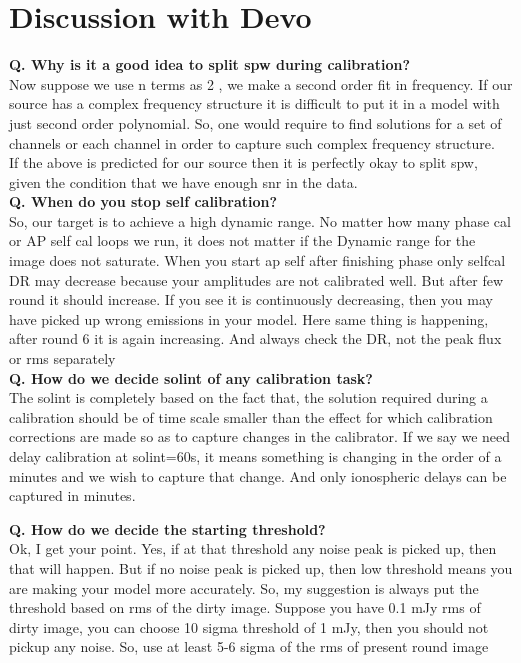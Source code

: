 \documentclass[11pt]{report}
\newcommand{\tbf}[1]{\textbf{#1}}
\begin{document}
\section{Discussion with Devo}
\tbf{Q.  Why is it a good idea to split spw during calibration?}\\

Now suppose we use n terms as 2 , we make a second order fit in frequency. If our source has a complex frequency structure it is difficult to put it in a model with just second order polynomial. So, one would require to find solutions for a set of channels or each channel in order to capture such complex frequency structure. \\

If the above is predicted for our source then it is perfectly okay to split spw,  given the condition that we have enough snr in the data. \\


\tbf{Q. When do you stop self calibration?}\\

So, our target is to achieve a high dynamic range. No matter how many phase cal or AP self cal loops we run, it does not matter if the Dynamic range for the image does not saturate.  When you start ap self after finishing phase only selfcal DR may decrease because your amplitudes are not calibrated well. But after few round it should increase. If you see it is continuously decreasing, then you may have picked up wrong emissions in your model. Here same thing is happening, after round 6 it is again increasing. And always check the DR, not the peak flux or rms separately\\

\tbf{Q. How do we decide solint of any calibration task?}\\

The solint is completely based on the fact that, the solution  required during  a calibration should be of time scale smaller than the effect for which calibration corrections are made so as to capture changes in the calibrator. If we say we need delay calibration at solint=60s, it means something is changing in the order of a minutes and we wish to capture that change. And only ionospheric delays can be captured in minutes.

\tbf{Q. 	How do we decide the starting threshold?}\\

Ok, I get your point. Yes, if at that threshold any noise peak is picked up, then that will happen. But if no noise peak is picked up, then low threshold means you are making your model more accurately. So, my suggestion is always put the threshold based on rms of the dirty image. Suppose you have 0.1 mJy rms of dirty image, you can choose 10 sigma threshold of 1 mJy, then you should not pickup any noise. So, use at least 5-6 sigma of the rms of present round image
\end{document}
